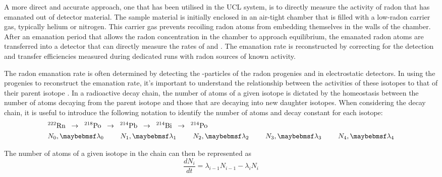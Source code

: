 A more direct and accurate approach, one that has been utilised in the UCL system, is to directly measure the activity of radon that has emanated out of detector material. The sample material is initially enclosed in an air-tight chamber that is filled with a low-radon carrier gas, typically helium or nitrogen. This carrier gas prevents recoiling radon atoms from embedding themselves in the walls of the chamber.  After an emanation period that allows the radon concentration in the chamber to approach equilibrium, the emanated radon atoms are transferred into a detector that can directly measure the rates of \PoTOE{} and \PoTOF{}. The emanation rate is reconstructed by correcting for the detection and transfer efficiencies measured during dedicated runs with radon sources of known activity. 

The radon emanation rate is often determined by detecting the \alpha-particles of the radon progenies \PoTOE{} and \PoTOF{} in electrostatic detectors. In using the progenies to reconstruct the emanation rate, it's important to understand the relationship between the activities of these isotopes to that of their parent isotope \RnTTT{}. In a radioactive decay chain, the number of atoms of a given isotope is dictated by the homeostasis between the number of atoms decaying from the parent isotope and those that are decaying into new daughter isotopes. When considering the decay chain, it is useful to introduce the following notation to identify the number of atoms and decay constant for each isotope:
%
\begin{align*}
    &^{222}\MathText{Rn} \;\; \rightarrow \;\; ^{218}\MathText{Po} \;\; \rightarrow \;\; ^{214}\MathText{Pb} \;\; \rightarrow \;\; ^{214}\MathText{Bi} \;\; \rightarrow \;\; ^{214}\MathText{Po} \\
    &N_{0}, \lambda{}_{0} \,\,\,\,\,\,\,\,\,\,\,\,\,\,
    N_{1}, \lambda{}_{1} \,\,\,\,\,\,\,\,\,\,\,\,\,\,
    N_{2}, \lambda{}_{2} \,\,\,\,\,\,\,\,\,\,\,\,\,\,
    N_{3}, \lambda{}_{3} \,\,\,\,\,\,\,\,\,\,\,\,\,\,
    N_{4}, \lambda{}_{4} 
    \label{eq:radon_decay_chain}
\end{align*}
%

The number of atoms of a given isotope in the chain can then be represented as 
%
\begin{equation}
    \frac{dN_{i}}{dt} = \lambda_{i-1}N_{i-1} - \lambda_{i}N_{i}
    \label{eq:isotopic_chance_in_chain}
\end{equation}
%

